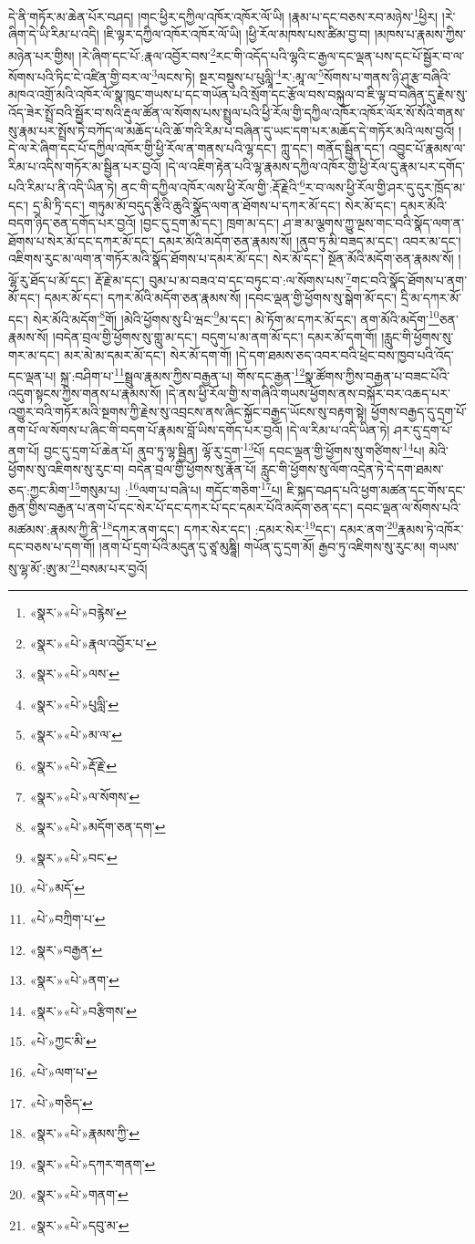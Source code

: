 དེ་ནི་གཏོར་མ་ཆེན་པོར་བཤད། །གང་ཕྱིར་དཀྱིལ་འཁོར་འཁོར་ལོ་ཡི། །རྣམ་པ་དང་བཅས་རབ་མཉེས་\footnote{«སྣར་»«པེ་»བརྙེས་}ཕྱིར། །རེ་ཞིག་དེ་ཡི་རིམ་པ་འདི། །ཇི་ལྟར་དཀྱིལ་འཁོར་འཁོར་ལོ་ཡི། །ཕྱི་རོལ་མཁས་པས་ཚིམ་བྱ་བ། །མཁས་པ་རྣམས་ཀྱིས་མཉེན་པར་གྱིས། །རེ་ཞིག་དང་པོ་:རྣལ་འབྱོར་བས་\footnote{«སྣར་»«པེ་»རྣལ་འབྱོར་པ་}རང་གི་འདོད་པའི་ལྷའི་ང་རྒྱལ་དང་ལྡན་པས་དང་པོ་སྦྱོར་བ་ལ་སོགས་པའི་ཏིང་ངེ་འཛིན་གྱི་བར་ལ་\footnote{«སྣར་»«པེ་»ལས་}ལངས་ཏེ། སྔར་བསྡུས་པ་པུལླཱི་\footnote{«སྣར་»«པེ་»པུལླི་}ར་:མཱ་ལ་\footnote{«སྣར་»«པེ་»མ་ལ་}སོགས་པ་གནས་ཉི་ཤུ་རྩ་བཞིའི་མཁའ་འགྲོ་མའི་འཁོར་ལོ་སྣ་ཁུང་གཡས་པ་དང་གཡོན་པའི་སྲོག་དང་རྩོལ་བས་བསྐུལ་བ་ཇི་ལྟ་བ་བཞིན་དུ་རྗེས་སུ་འོད་ཟེར་སྤྲོ་བའི་སྦྱོར་བ་སའི་རྡུལ་ཚོན་ལ་སོགས་པས་སྤྲུལ་པའི་ཕྱི་རོལ་གྱི་དཀྱིལ་འཁོར་འཁོར་ལོར་སོ་སོའི་གནས་སུ་རྣམ་པར་སྤྲོས་ཏེ་བཀོད་ལ་མཆོད་པའི་ཆོ་གའི་རིམ་པ་བཞིན་དུ་ཡང་དག་པར་མཆོད་དེ་གཏོར་མའི་ལས་བྱའོ། །དེ་ལ་རེ་ཞིག་དང་པོ་དཀྱིལ་འཁོར་གྱི་ཕྱི་རོལ་ན་གནས་པའི་ལྷ་དང་། ཀླུ་དང་། གནོད་སྦྱིན་དང་། འབྱུང་པོ་རྣམས་ལ་རིམ་པ་འདིས་གཏོར་མ་སྦྱིན་པར་བྱའོ། །དེ་ལ་འཇིག་རྟེན་པའི་ལྷ་རྣམས་དཀྱིལ་འཁོར་གྱི་ཕྱི་རོལ་དུ་རྣམ་པར་དགོད་པའི་རིམ་པ་ནི་འདི་ཡིན་ཏེ། ནང་གི་དཀྱིལ་འཁོར་ལས་ཕྱི་རོལ་གྱི་:རྡོ་རྗེའི་\footnote{«སྣར་»«པེ་»རྡོ་རྗེ་}ར་བ་ལས་ཕྱི་རོལ་གྱི་ཤར་དུ་དུར་ཁྲོད་མ་དང་། དྲ་མི་ཏྲི་དང་། གཏུམ་མོ་བདུད་རྩིའི་ཆུའི་སྣོད་ལག་ན་ཐོགས་པ་དཀར་མོ་དང་། སེར་མོ་དང་། དམར་མོའི་བདག་ཉིད་ཅན་དགོད་པར་བྱའོ། །བྱང་དུ་དྲག་མོ་དང་། ཁྲག་མ་དང་། ཤ་ཟ་མ་ལྕགས་ཀྱུ་ལྔས་གང་བའི་སྣོད་ལག་ན་ཐོགས་པ་སེར་མོ་དང་དཀར་མོ་དང་། དམར་མོའི་མདོག་ཅན་རྣམས་སོ། །ནུབ་ཏུ་མི་བཟད་མ་དང་། འབར་མ་དང་། འཇིགས་རུང་མ་ལག་ན་གཏོར་མའི་སྣོད་ཐོགས་པ་དམར་མོ་དང་། སེར་མོ་དང་། སྔོན་མོའི་མདོག་ཅན་རྣམས་སོ། །ལྷོ་རུ་ཐོད་པ་མོ་དང་། རྡོ་རྗེ་མ་དང་། བུམ་པ་མ་བཟའ་བ་དང་བཏུང་བ་:ལ་སོགས་པས་\footnote{«སྣར་»«པེ་»ལ་སོགས་}གང་བའི་སྣོད་ཐོགས་པ་ནག་མོ་དང་། དམར་མོ་དང་། དཀར་མོའི་མདོག་ཅན་རྣམས་སོ། །དབང་ལྡན་གྱི་ཕྱོགས་སུ་སྒེག་མོ་དང་། དྲི་མ་དཀར་མོ་དང་། སེར་མོའི་མདོག་\footnote{«སྣར་»«པེ་»མདོག་ཅན་དག་}གོ། །མེའི་ཕྱོགས་སུ་པི་ཝང་\footnote{«སྣར་»«པེ་»བང་}མ་དང་། མེ་ཏོག་མ་དཀར་མོ་དང་། ནག་མོའི་མདོག་\footnote{«པེ་»མདོ་}ཅན་རྣམས་སོ། །བདེན་བྲལ་གྱི་ཕྱོགས་སུ་གླུ་མ་དང་། བདུག་པ་མ་ནག་མོ་དང་། དམར་མོ་དག་གོ། །རླུང་གི་ཕྱོགས་སུ་གར་མ་དང་། མར་མེ་མ་དམར་མོ་དང་། སེར་མོ་དག་གོ། །དེ་དག་ཐམས་ཅད་འབར་བའི་ཕྲེང་བས་ཁྱབ་པའི་འོད་དང་ལྡན་པ། སྐྲ་:བཤིག་པ་\footnote{«པེ་»བཀྲིག་པ་}སྦྲུལ་རྣམས་ཀྱིས་བརྒྱན་པ། གོས་དང་རྒྱན་\footnote{«སྣར་»བརྒྱན་}སྣ་ཚོགས་ཀྱིས་བརྒྱན་པ་བཟང་པོའི་འདུག་སྟངས་ཀྱིས་གནས་པ་རྣམས་སོ། །དེ་ནས་ཕྱི་རོལ་གྱི་ས་གཞིའི་གཡས་ཕྱོགས་ནས་བསྐོར་བར་འཆད་པར་འགྱུར་བའི་གཏོར་མའི་སྔགས་ཀྱི་རྗེས་སུ་འབྲངས་ནས་ཞིང་སྐྱོང་བརྒྱད་ཡོངས་སུ་བརྟག་སྟེ། ཕྱོགས་བརྒྱད་དུ་དྲག་པོ་ནག་པོ་ལ་སོགས་པ་ཞིང་གི་བདག་པོ་རྣམས་བློ་ཡིས་དགོད་པར་བྱའོ། །དེ་ལ་རིམ་པ་འདི་ཡིན་ཏེ། ཤར་དུ་དྲག་པོ་ནག་པོ། བྱང་དུ་དྲག་པོ་ཆེན་པོ། ནུབ་ཏུ་ལྷ་སྦྱིན། ལྷོ་རུ་དྲག་\footnote{«སྣར་»«པེ་»ནག་}པོ། དབང་ལྡན་གྱི་ཕྱོགས་སུ་གཙིགས་\footnote{«སྣར་»«པེ་»བརྩིགས་}པ། མེའི་ཕྱོགས་སུ་འཇིགས་སུ་རུང་བ། བདེན་བྲལ་གྱི་ཕྱོགས་སུ་རྣོན་པོ། རླུང་གི་ཕྱོགས་སུ་ལོག་འདྲེན་ཏེ་དེ་དག་ཐམས་ཅད་:ཀྱང་མིག་\footnote{«པེ་»ཀྱང་མི་}གསུམ་པ། :\footnote{«པེ་»ལག་པ་}ལག་པ་བཞི་པ། གདོང་གཅིག་\footnote{«པེ་»གཅིད་}པ། ཇི་སྐད་བཤད་པའི་ཕྱག་མཚན་དང་གོས་དང་རྒྱན་གྱིས་བརྒྱན་པ་ནག་པོ་དང་སེར་པོ་དང་དཀར་པོ་དང་དམར་པོའི་མདོག་ཅན་དང་། དབང་ལྡན་ལ་སོགས་པའི་མཚམས་:རྣམས་ཀྱི་ནི་\footnote{«སྣར་»«པེ་»རྣམས་ཀྱི་}དཀར་ནག་དང་། དཀར་སེར་དང་། :དམར་སེར་\footnote{«སྣར་»«པེ་»དཀར་གནག་}དང་། དམར་ནག་\footnote{«སྣར་»«པེ་»གནག་}རྣམས་ཏེ་འཁོར་དང་བཅས་པ་དག་གོ། །ནག་པོ་དྲག་པོའི་མདུན་དུ་ཙཱ་མུཎྜཱི། གཡོན་དུ་དྲག་མོ། རྒྱབ་ཏུ་འཇིགས་སུ་རུང་མ། གཡས་སུ་ལྷ་མོ་:ཨུ་མ་\footnote{«སྣར་»«པེ་»དབུ་མ་}བསམ་པར་བྱའོ། 